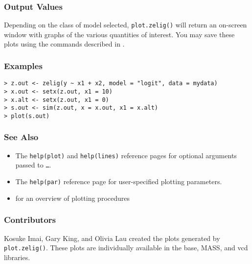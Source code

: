 \subsubsection{Output Values}
Depending on the class of model selected, \texttt{plot.zelig()} will
return an on-screen window with graphs of the various quantities of
interest.  You may save these plots using the commands described in
.  

\subsubsection{Examples}
\begin{verbatim}
> z.out <- zelig(y ~ x1 + x2, model = "logit", data = mydata)
> x.out <- setx(z.out, x1 = 10)
> x.alt <- setx(z.out, x1 = 0)
> s.out <- sim(z.out, x = x.out, x1 = x.alt)
> plot(s.out)
\end{verbatim}

\subsubsection{See Also}
\begin{itemize}
\item The {\tt help(plot)} and {\tt help(lines)} reference pages for
  optional arguments passed to {\tt \dots}.
\item The {\tt help(par)} reference page for user-specified plotting
  parameters.     
\item {} for an overview of plotting procedures
\end{itemize}

\subsubsection{Contributors}

Kosuke Imai, Gary King, and Olivia Lau created the plots generated by
{\tt plot.zelig()}.  These plots are individually available in the
base, MASS, and vcd libraries.  

